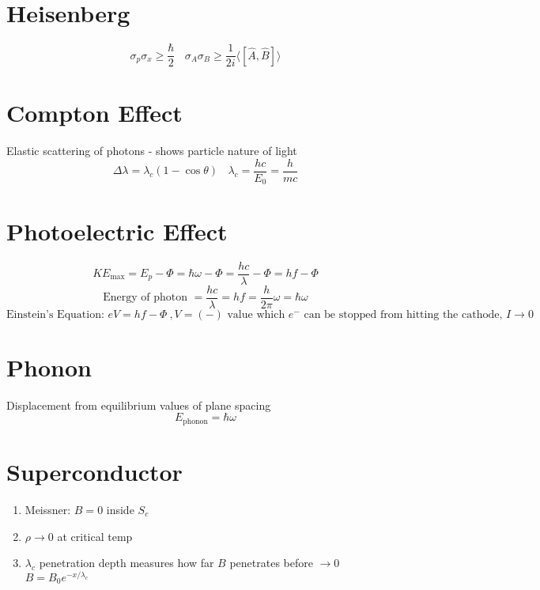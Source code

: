 \documentclass[10pt,letter]{article}
\begin{document}
\section{Heisenberg} %
\label{sec:heisenburg}
\begin{equation}
    \sigma_p \sigma_x \geq \frac{\hbar}{2} ~~~~ \sigma_A \sigma_B \geq \frac{1}{2i} \langle [\hat{A},\hat{B} ] \rangle
\end{equation}

\section{Compton Effect} %
\label{sec:compton_effect}
Elastic scattering of photons - shows particle nature of light
\begin{equation}
    \Delta \lambda = \lambda_c ( 1 - \cos \theta)~~~~ \lambda_c = \frac{hc}{E_0} = \frac{h}{mc}
\end{equation}

\section{Photoelectric Effect} %
\label{sec:photoelectric_effect}
\begin{equation}
    KE_{\textrm{max}} = E_p - \Phi = \hbar \omega - \Phi = \frac{hc}{\lambda}-\Phi = hf - \Phi
\end{equation}
\begin{equation}
    \textrm{Energy of photon }=\frac{hc}{\lambda} = hf = \frac{h}{2\pi}\omega = \hbar \omega
\end{equation}
\begin{equation}
    \textrm{Einstein's Equation: }eV = hf - \Phi~, V = (-)\textrm{ value which $e^-$ can be stopped from hitting the cathode, }I \rightarrow 0
\end{equation}

\section{Phonon} %
\label{sec:phonon}
Displacement from equilibrium values of plane spacing
\begin{equation}
    E_{\textrm{phonon}}=\hbar \omega
\end{equation}

\section{Superconductor} %
\label{sec:superconductor}
\begin{enumerate}
    \item Meissner: $B=0$ inside $S_c$ 
    \item $\rho \rightarrow 0$ at critical temp
    \item $\lambda_c$ penetration depth measures how far $B$ penetrates before $\rightarrow 0$\\
    $B = B_0e^{-x/\lambda_c}$
\end{enumerate}
\end{document}
